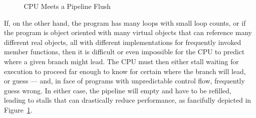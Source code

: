 \begin{figure}[htb]
\begin{center}
\end{center}
\caption{CPU Meets a Pipeline Flush}
\label{fig:cpu:CPU Meets a Pipeline Flush}
\end{figure}

If, on the other hand, the program has many loops with small loop counts,
or if the program is object oriented with many virtual objects that
can reference many different real objects, all with different implementations
for frequently invoked member functions, then it is difficult or even
impossible for the CPU to predict where a given branch might lead.
The CPU must then either stall waiting for execution to proceed far enough
to know for certain where the branch will lead, or guess --- and, in
face of programs with unpredictable control flow, frequently guess wrong.
In either case, the pipeline will empty and have to be refilled, leading
to stalls that can drastically reduce performance,
as fancifully depicted in Figure~\ref{fig:cpu:CPU Meets a Pipeline Flush}.

